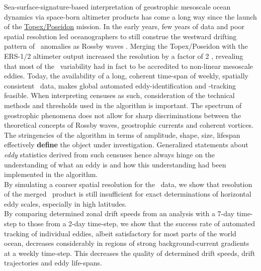 Sea-surface-signature-based interpretation of geostrophic mesoscale ocean dynamics via space-born altimeter products has come a long way since the launch of the \href{http://en.wikipedia.org/wiki/TOPEX/Poseidon}{Topex/Poseidon} mission. In the early years, few years of data and poor spatial resolution led oceanographers to still construe the westward drifting pattern of \SSH~anomalies as Rossby waves \citep{le1993sea,Killworth1997a}.
Merging the Topex/Poseidon with the ERS-1/2 altimeter output increased the resolution by a factor of 2 \citep{Chelton2007}, revealing that most of the \SSH~variability had in fact to be accredited to non-linear mesoscale eddies. Today, the availability of a long, coherent time-span of weekly, spatially consistent \SSH~data, makes global automated eddy-identification and -tracking feasible.
When interpreting censuses as such, consideration of the technical methods and thresholds used in the algorithm is important. The spectrum of geostrophic phenomena does not allow for sharp discriminations between the theoretical concepts of Rossby waves, geostrophic currents and coherent vortices.
The stringencies of the algorithm in terms of amplitude, shape, size, lifespan \etc effectively \textbf{define} the object under investigation. Generalized statements about \textit{eddy} statistics derived from such censuses hence always hinge on the understanding of what an eddy is and how this understanding had been implemented in the algorithm.\\
By simulating a coarser spatial resolution for the \pop~data, we show that resolution of the merged \avi~product is still insufficient for exact determinations of horizontal eddy scales, especially in high latitudes.\\
By comparing determined zonal drift speeds from an analysis with a 7-day time-step to those from a 2-day time-step, we show that the success rate of automated tracking of individual eddies, albeit satisfactory for most parts of the world ocean, decreases considerably in regions of strong background-current gradients at a weekly time-step. This decreases the quality of determined drift speeds, drift trajectories and eddy life-spans. 
